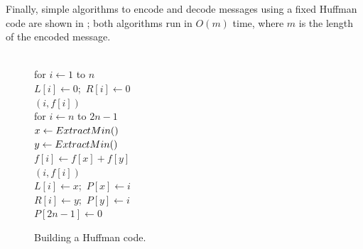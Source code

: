 Finally, simple algorithms to encode and decode messages using a fixed Huffman code are shown in ; both algorithms run in $O(m)$ time, where $m$ is the length of the encoded message.

\begin{figure}[ht]
\centering
\begin{pseudocode}
\\
for $i \gets 1$ to $n$\\
\Indent $L[i] \gets 0$;\ $R[i] \gets 0$\\
\Indent {}$(i, f[i])$\\
for $i \gets n$ to $2n-1$\\
\Indent $x \gets ExtractMin()$ \\
\Indent $y \gets ExtractMin()$\\
\Indent $f[i] \gets f[x] + f[y]$ \\
\Indent {}$(i, f[i])$\\
\Indent $L[i] \gets x$;\ $P[x] \gets i$ \\
\Indent $R[i] \gets y$;\ $P[y] \gets i$\\
$P[2n-1] \gets 0$
\end{pseudocode}
\caption{Building a Huffman code.}
\label{fig:4.4}
\end{figure}

